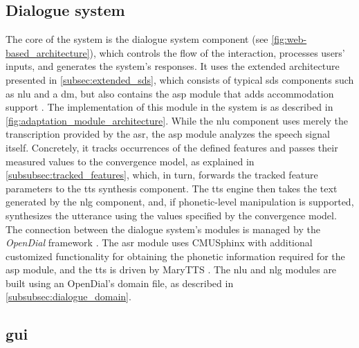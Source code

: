 \subsection{Dialogue system}
\label{subsec:dialogue_system}

The core of the system is the dialogue system component (see \cref{fig:web-based_architecture}), which controls the flow of the interaction, processes users' inputs, and generates the system's responses.
It uses the extended architecture presented in \cref{subsec:extended_sds}, which consists of typical \ac{sds} components such as \ac{nlu} and a \ac{dm}, but also contains the \ac{asp} module that adds accommodation support \citep{Raveh2017SemDial}.
The implementation of this module in the system is as described in \cref{fig:adaptation_module_architecture}.
While the \ac{nlu} component uses merely the transcription provided by the \ac{asr}, the \ac{asp} module analyzes the speech signal itself.
Concretely, it tracks occurrences of the defined features and passes their measured values to the convergence model, as explained in \cref{subsubsec:tracked_features}, which, in turn, forwards the tracked feature parameters to the \ac{tts} synthesis component.
The \ac{tts} engine then takes the text generated by the \ac{nlg} component, and, if phonetic-level manipulation is supported, synthesizes the utterance using the values specified by the convergence model.
The connection between the dialogue system's modules is managed by the \emph{OpenDial} framework \citep{Lison2016opendial, Lison2015developing}.
The \ac{asr} module uses CMUSphinx \citep{Lamere2003sphinx} with additional customized functionality for obtaining the phonetic information required for the \ac{asp} module, and the \ac{tts} is driven by MaryTTS \citep{LeMaguer2017uprooted, Schroeder2003mary}.
The \ac{nlu} and \ac{nlg} modules are built using an OpenDial's domain file, as described in \cref{subsubsec:dialogue_domain}.

\subsection{\Acl{gui}}
\label{subsec:graphical_user_interface}

